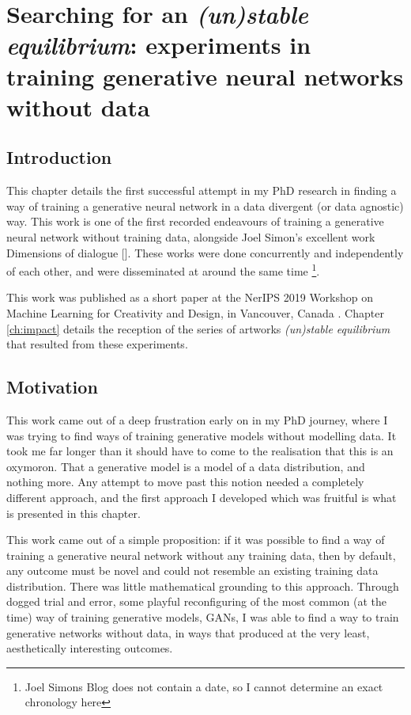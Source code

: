 \chapter{Searching for an \textit{(un)stable equilibrium}:
experiments in training generative neural networks without data}
\label{ch:unstable_eq}

\section{Introduction}

This chapter details the first successful attempt in my PhD research in finding a way of training a generative neural network in a data divergent (or data agnostic) way. 
This work is one of the first recorded endeavours of training a generative neural network without training data, alongside Joel Simon’s excellent work Dimensions of dialogue [\citeyear{simon2019dimensions}]. 
These works were done concurrently and independently of each other, and were disseminated at around the same time \footnote{Joel Simons Blog does not contain a date, so I cannot determine an exact chronology here}. 

This work was published as a short paper at the NerIPS 2019 Workshop on Machine Learning for Creativity and Design, in Vancouver, Canada \citep{broad2019searching}. 
Chapter \ref{ch:impact} details the reception of the series of artworks \textit{(un)stable equilibrium} that resulted from these experiments. 

\section{Motivation}

This work came out of a deep frustration early on in my PhD journey, where I was trying to find ways of training generative models without modelling data.
It took me far longer than it should have to come to the realisation that this is an oxymoron. 
That a generative model is a model of a data distribution, and nothing more. 
Any attempt to move past this notion needed a completely different approach, and the first approach I developed which was fruitful is what is presented in this chapter. 

This work came out of a simple proposition: if it was possible to find a way of training a generative neural network without any training data, then by default, any outcome must be novel and could not resemble an existing training data distribution. 
There was little mathematical grounding to this approach. 
Through dogged trial and error, some playful reconfiguring of the most common (at the time) way of training generative models, GANs, I was able to find a way to train generative networks without data, in ways that produced at the very least, aesthetically interesting outcomes. 

